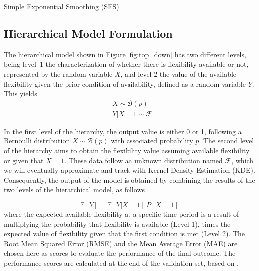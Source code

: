 \begin{algorithm}
	\SetAlgoLined
	\caption{Simple Exponential Smoothing (SES)}
	\label{alg:SES}
\end{algorithm}


\subsection{Hierarchical Model Formulation}
The hierarchical model shown in Figure \ref{fig:top_down} has two different levels, being level~1 the characterization of whether there is flexibility available or not, represented by the random variable $X$, and level 2 the value of the available flexibility given the prior condition of availability, defined as a random variable $Y$. This yields
\begin{subequations}
\begin{align} 
\label{eq:hierarchicalpierre}
  & X \sim \mathcal{B}(p) \\
  & Y|X=1 \sim \mathcal{F}
\end{align}
\end{subequations}

In the first level of the hierarchy, the output value is either 0 or 1, following a Bernoulli distribution $X \sim \mathcal{B}(p)$ with associated probability $p$. The second level of the hierarchy aims to obtain the flexibility value assuming available flexibility or given that $X=1$. These data follow an unknown distribution named $\mathcal{F}$, which we will eventually approximate and track with Kernel Density Estimation (KDE). Consequently, the output of the model is obtained by combining the results of the two levels of the hierarchical model, as follows

\begin{equation} \label{eq:bernoulli}
  \mathbb{E}[Y] = \mathbb{E}[Y|X=1] \,  P[X=1]
\end{equation}
where the expected available flexibility at a specific time period is a result of multiplying the probability that flexibility is available (Level 1), times the expected value of flexibility given that the first condition is met (Level 2). The Root Mean Squared Error (RMSE) and the Mean Average Error (MAE) are chosen here as scores to evaluate the performance of the final outcome. The performance scores are calculated  at the end of the validation set, based on \cite{Hyndman2021}.

